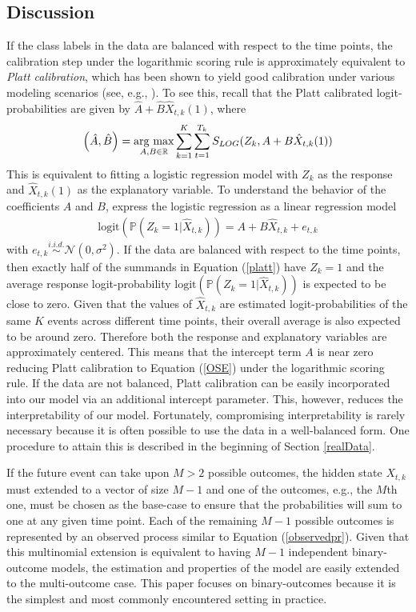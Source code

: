 \documentclass[aoas, preprint]{imsart}
\newcommand{\argmax}{\operatornamewithlimits{arg\ max}}
\numberwithin{equation}{section}
\theoremstyle{plain}
\newcommand{\R}{\mathbb{R}}
\renewcommand{\P}{\mathbb{P}}
\newcommand{\logit}{\text{logit}}
\begin{document}
\subsection{Discussion}
If the class labels in the data are balanced with respect to the time points, the calibration step under the logarithmic scoring rule is approximately equivalent to \textit{Platt calibration}, which has been shown to yield good calibration under various modeling scenarios (see, e.g., \citet{platt1999probabilistic, niculescu2005obtaining}). To see this, recall that the Platt calibrated logit-probabilities are given by $\hat{A} + \hat{B}\hat{X}_{t,k}(1)$, where 
\begin{eqnarray}
\left(\hat{A}, \hat{B} \right) =  \argmax_{A, B \in \R} \sum_{k=1}^K \sum_{t=1}^{T_k}  S_{LOG}(Z_k, A + B\hat{X}_{t,k}(1) ) \label{platt}
\end{eqnarray}
This is equivalent to fitting a logistic regression model with $Z_k$ as the response and $\hat{X}_{t,k}(1)$ as the explanatory variable.
To understand the behavior of the coefficients $A$ and $B$, express the logistic regression as a linear regression model
\begin{eqnarray*}
\logit(\P(Z_k = 1 | \hat{X}_{t,k})) = A + B\hat{X}_{t,k} + e_{t,k}
\end{eqnarray*}
with $e_{t,k} \stackrel{i.i.d.}{\sim} \mathcal{N}(0,\sigma^2)$. If the data are balanced with respect to the time points, then exactly half of the summands in Equation (\ref{platt}) have $Z_k = 1$ and the average response logit-probability $\logit(\P(Z_k = 1 | \hat{X}_{t,k})) $ is expected to be close to zero. Given that the values of $\hat{X}_{t,k}$ are estimated logit-probabilities of the same $K$ events across different time points, their overall average is also expected to be around zero. Therefore both the response and explanatory variables are approximately centered. This means that the intercept term $A$ is near zero reducing Platt calibration to Equation (\ref{OSE}) under the logarithmic scoring rule. If the data are not balanced, Platt calibration can be easily incorporated into our model via an additional intercept parameter. This, however, reduces the interpretability of our model. Fortunately, compromising interpretability is rarely necessary because it is often possible to use the data in a well-balanced form. One procedure to attain this is described in the beginning of Section \ref{realData}.

If the future event can take upon $M > 2$ possible outcomes, the hidden state $X_{t,k}$ must extended to a vector of size $M-1$ and one of the outcomes, e.g., the $M$th one, must be chosen as the base-case to ensure that the probabilities will sum to one at any given time point. Each of the remaining  $M-1$ possible outcomes is represented by an observed process similar to Equation (\ref{observedpr}). Given that this multinomial extension is equivalent to having $M-1$ independent binary-outcome models, the estimation and properties of the model are easily extended to the multi-outcome case. This paper focuses on binary-outcomes because it is the simplest and most commonly encountered setting in practice. 
\end{document}
